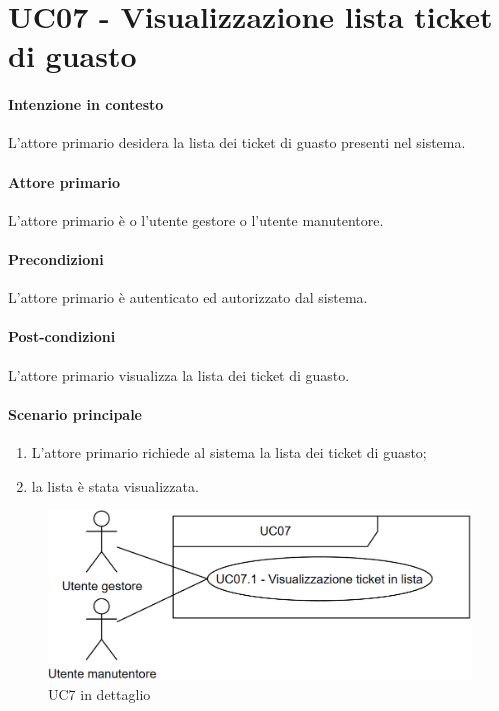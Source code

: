 \section{UC07 - Visualizzazione lista ticket di guasto}\label{uc:07}
\paragraph{Intenzione in contesto} L'attore primario desidera la lista dei ticket di guasto presenti nel sistema.

\paragraph{Attore primario} L'attore primario è o l'utente gestore o l'utente manutentore.
\paragraph{Precondizioni} L'attore primario è autenticato ed autorizzato dal sistema.
\paragraph{Post-condizioni} L'attore primario visualizza la lista dei ticket di guasto.
\paragraph{Scenario principale}
\begin{enumerate}
    \item L'attore primario richiede al sistema la lista dei ticket di guasto;
    \item la lista è stata visualizzata.
\end{enumerate}

\begin{figure}[h]
    \includegraphics[width=\textwidth]{contenuti/img/casi_uso_grafici-uc07.png}
    \caption{UC7 in dettaglio}
    \label{fig:uc07}
\end{figure}


